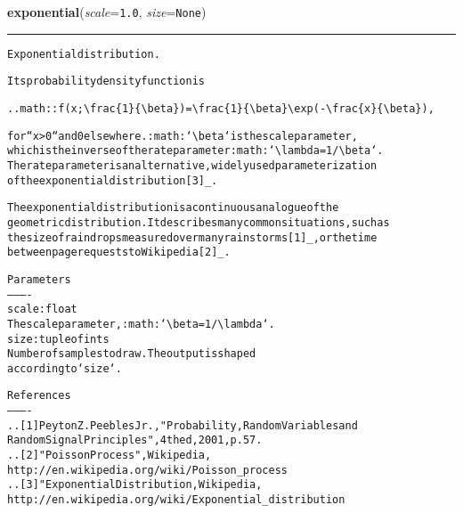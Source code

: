     \label{QSTK:qstklearn:mldiagnostics:exponential}

    \vspace{0.5ex}

\hspace{.8\funcindent}\begin{boxedminipage}{\funcwidth}

    \raggedright \textbf{exponential}(\textit{scale}={\tt 1.0}, \textit{size}={\tt None})

    \vspace{-1.5ex}

    \rule{\textwidth}{0.5\fboxrule}
\setlength{\parskip}{2ex}
\begin{alltt}
Exponential distribution.

Its probability density function is

.. math:: f(x; {\textbackslash}frac\{1\}\{{\textbackslash}beta\}) = {\textbackslash}frac\{1\}\{{\textbackslash}beta\} {\textbackslash}exp(-{\textbackslash}frac\{x\}\{{\textbackslash}beta\}),

for ``x {\textgreater} 0`` and 0 elsewhere. :math:`{\textbackslash}beta` is the scale parameter,
which is the inverse of the rate parameter :math:`{\textbackslash}lambda = 1/{\textbackslash}beta`.
The rate parameter is an alternative, widely used parameterization
of the exponential distribution [3]\_.

The exponential distribution is a continuous analogue of the
geometric distribution.  It describes many common situations, such as
the size of raindrops measured over many rainstorms [1]\_, or the time
between page requests to Wikipedia [2]\_.

Parameters
----------
scale : float
    The scale parameter, :math:`{\textbackslash}beta = 1/{\textbackslash}lambda`.
size : tuple of ints
    Number of samples to draw.  The output is shaped
    according to `size`.

References
----------
.. [1] Peyton Z. Peebles Jr., "Probability, Random Variables and
       Random Signal Principles", 4th ed, 2001, p. 57.
.. [2] "Poisson Process", Wikipedia,
       http://en.wikipedia.org/wiki/Poisson\_process
.. [3] "Exponential Distribution, Wikipedia,
       http://en.wikipedia.org/wiki/Exponential\_distribution
\end{alltt}

\setlength{\parskip}{1ex}
    \end{boxedminipage}

